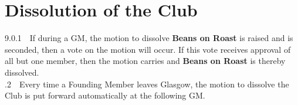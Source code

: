 \documentclass[a4paper,11pt]{article}
\begin{document}
\section{Dissolution of the Club}
9.0.1$\quad$If during a GM, the motion to dissolve \textbf{Beans on Roast} is raised and is seconded, then a vote on the motion will occur. If this vote receives approval of all but one member, then the motion carries and \textbf{Beans on Roast} is thereby dissolved.\\ 

.2$\quad$Every time a Founding Member leaves Glasgow, the motion to dissolve the Club is put forward automatically at the following GM.
\end{document}
